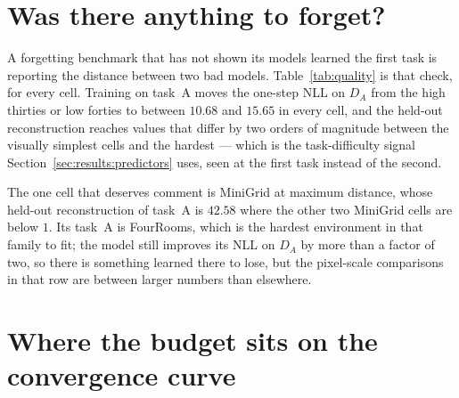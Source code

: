 %

\appendix

\section{Was there anything to forget?}
\label{sec:appendix:quality}

\begin{table}[h]
  \centering
  
  \caption{Task-A quality per cell, measured before any task switch and pooled
  over methods --- at that point in the protocol every method has trained on
  task~A and nothing else. \emph{Held-out recon.} is squared error summed over
  the $3 \times 64 \times 64$ frame on episodes never trained on. The two NLL
  columns are the transition component's one-step negative log-likelihood on
  $D_A$ at initialisation and after training, so their difference is what
  training bought.}
  \label{tab:quality}
\end{table}

A forgetting benchmark that has not shown its models learned the first task is
reporting the distance between two bad models. Table~\ref{tab:quality} is that
check, for every cell. Training on task~A moves the one-step NLL on $D_A$ from
the high thirties or low forties to between $10.68$ and $15.65$ in every cell,
and the held-out reconstruction reaches values that differ by two orders of
magnitude between the visually simplest cells and the hardest --- which is the
task-difficulty signal Section~\ref{sec:results:predictors} uses, seen at the
first task instead of the second.

The one cell that deserves comment is MiniGrid at maximum distance, whose
held-out reconstruction of task~A is $42.58$ where the other two MiniGrid cells
are below $1$. Its task~A is FourRooms, which is the hardest environment in that
family to fit; the model still improves its NLL on $D_A$ by more than a factor
of two, so there is something learned there to lose, but the pixel-scale
comparisons in that row are between larger numbers than elsewhere.

\section{Where the budget sits on the convergence curve}
\label{sec:appendix:budget}

